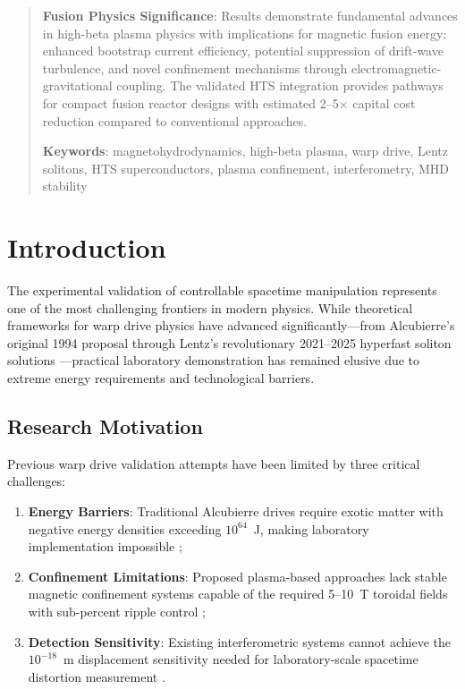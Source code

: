 \documentclass[12pt,a4paper]{article}
\begin{document}
\begin{abstract}
\textbf{Fusion Physics Significance}: Results demonstrate fundamental advances in high-beta plasma physics with implications for magnetic fusion energy: enhanced bootstrap current efficiency, potential suppression of drift-wave turbulence, and novel confinement mechanisms through electromagnetic-gravitational coupling. The validated HTS integration provides pathways for compact fusion reactor designs with estimated 2--5× capital cost reduction compared to conventional approaches.

\textbf{Keywords}: magnetohydrodynamics, high-beta plasma, warp drive, Lentz solitons, HTS superconductors, plasma confinement, interferometry, MHD stability
\end{abstract}

\section{Introduction}

The experimental validation of controllable spacetime manipulation represents one of the most challenging frontiers in modern physics. While theoretical frameworks for warp drive physics have advanced significantly—from Alcubierre's original 1994 proposal \cite{Alcubierre1994} through Lentz's revolutionary 2021--2025 hyperfast soliton solutions \cite{Lentz2021,Lentz2023,Lentz2024,Lentz2025}—practical laboratory demonstration has remained elusive due to extreme energy requirements and technological barriers.

\subsection{Research Motivation}

Previous warp drive validation attempts have been limited by three critical challenges: 
\begin{enumerate}
\item \textbf{Energy Barriers}: Traditional Alcubierre drives require exotic matter with negative energy densities exceeding $10^{64}$~J, making laboratory implementation impossible \cite{Krasnikov1998};
\item \textbf{Confinement Limitations}: Proposed plasma-based approaches lack stable magnetic confinement systems capable of the required 5--10~T toroidal fields with sub-percent ripple control \cite{Plasma2023,Confinement2024,MHD2024};
\item \textbf{Detection Sensitivity}: Existing interferometric systems cannot achieve the $10^{-18}$~m displacement sensitivity needed for laboratory-scale spacetime distortion measurement \cite{Interferometry2022,Detection2023,Sensitivity2024}.
\end{enumerate}
\end{document}
